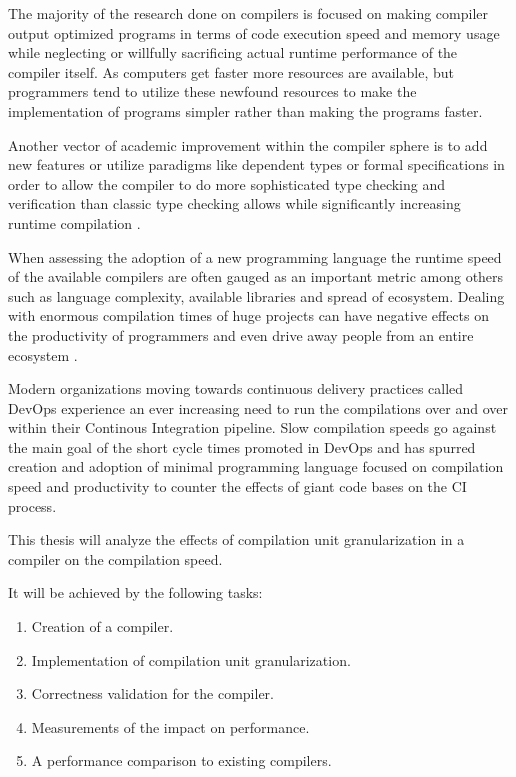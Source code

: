\documentclass{VUMIFPSbakalaurinis}
\begin{document}

The majority of the research done on compilers is focused on making compiler output optimized programs in terms of code execution speed and memory usage \cite{lopes2018future} while neglecting or willfully sacrificing \cite{fast2019compilers} actual runtime performance of the compiler itself.
As computers get faster more resources are available, but programmers tend to utilize these newfound resources to make the implementation of programs simpler rather than making the programs faster\cite{Wirth1995}.

Another vector of academic improvement within the compiler sphere is to add new features or utilize paradigms like dependent types or formal specifications\cite{RustVerification} in order to allow the compiler to do more sophisticated type checking and verification than classic type checking allows while significantly increasing runtime compilation .

When assessing the adoption of a new programming language the runtime speed of the available compilers are often gauged as an important metric\cite{ScalaSlow} among others such as language complexity, available libraries and spread of ecosystem.
Dealing with enormous compilation times of huge projects can have negative effects on the productivity of programmers and even drive away people from an entire ecosystem \cite{ScalaReallySlow, ScalaSlow}.

Modern organizations moving towards continuous delivery practices called DevOps \cite{DevOps} experience an ever increasing need to run the compilations over and over within their Continous Integration pipeline.
Slow compilation speeds go against the main goal of the short cycle times promoted in DevOps and has spurred creation and adoption of minimal programming language focused on compilation speed and productivity to counter the effects of giant code bases on the CI process\cite{TheGoProgrammingLanguage, GoGoogle}.

This thesis will analyze the effects of compilation unit granularization in a compiler on the compilation speed.

It will be achieved by the following tasks:

\begin{enumerate}
\item{Creation of a compiler.}
\item{Implementation of compilation unit granularization.}
\item{Correctness validation for the compiler.}
\item{Measurements of the impact on performance.}
\item{A performance comparison to existing compilers.}
\end{enumerate}
\end{document}
